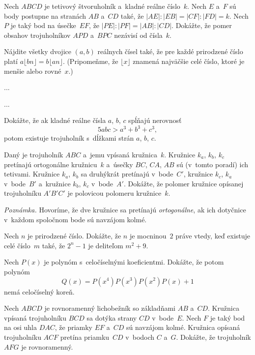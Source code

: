 {%
Nech $ABCD$ je tetivový štvoruholník a~kladné reálne číslo~$k$.
Nech $E$ a~$F$ sú body
postupne na stranách $AB$ a~$CD$ také, že
$|AE| : |EB| = |CF| : |FD| = k$.
Nech $P$ je taký bod na úsečke~$EF$, že
$|PE| : |PF| = |AB| : |CD|$.
Dokážte, že pomer obsahov trojuholníkov $APD$ a~$BPC$ nezávisí od čísla~$k$.}

{%
Nájdite všetky dvojice $(a,b)$ reálnych čísel také, že pre každé prirodzené
číslo platí $a\lfloor bn\rfloor=b\lfloor an\rfloor$. (Pripomeňme, že $\lfloor x\rfloor$ znamená najväčšie celé
číslo, ktoré je menšie alebo rovné~$x$.)}

{%
...}

{%
...}

{%
Dokážte, že ak kladné reálne čísla $a$, $b$, $c$ spĺňajú nerovnosť
$$
  5abc > a^3 + b^3 + c^3,
$$
potom existuje trojuholník s~dĺžkami strán $a$, $b$, $c$.}

{%
Daný je trojuholník $ABC$ a~jemu vpísaná kružnica~$k$.
Kružnice $k_a$, $k_b$, $k_c$ pretínajú ortogonálne kružnicu~$k$ a~úsečky
$BC$, $C\!A$, $AB$ sú (v~tomto poradí) ich tetivami.
Kružnice $k_a$, $k_b$ sa druhýkrát pretínajú v~bode~$C'$,
kružnice $k_c$, $k_a$ v~bode~$B'$
a~kružnice $k_b$, $k_c$ v~bode~$A'$.
Dokážte, že polomer kružnice opísanej trojuholníku $A'B'C'$ je
polovicou polomeru kružnice~$k$.

{\it Poznámka.} Hovoríme, že dve kružnice sa pretínajú
{\it ortogonálne}, ak ich dotyčnice v~každom spoločnom bode sú navzájom
kolmé.}

{%
Nech $n$ je prirodzené číslo. Dokážte, že
$n$ je mocninou~$2$ práve vtedy, keď existuje celé číslo~$m$ také, že
$2^n-1$ je deliteľom $m^2+9$.}

{%
Nech $P(x)$ je polynóm s~celočíselnými koeficientmi. Dokážte, že potom
polynóm
$$
  Q(x) = P(x^4) P(x^3) P(x^2) P(x) + 1
$$
nemá celočíselný koreň.}

{%
Nech $ABC\!D$ je rovnoramenný lichobežník so základňami $AB$ a~$C\!D$.
Kružnica vpísaná trojuholníku $BC\!D$ sa dotýka strany $C\!D$ v~bode~$E$.
Nech $F$ je taký bod na osi uhla $D\!AC$, že priamky $EF$ a~$C\!D$ sú
navzájom kolmé. Kružnica opísaná trojuholníku $AC\!F$ pretína
priamku~$C\!D$ v~bodoch $C$ a~$G$. Dokážte, že trojuholník $AFG$ je
rovnoramenný.}

